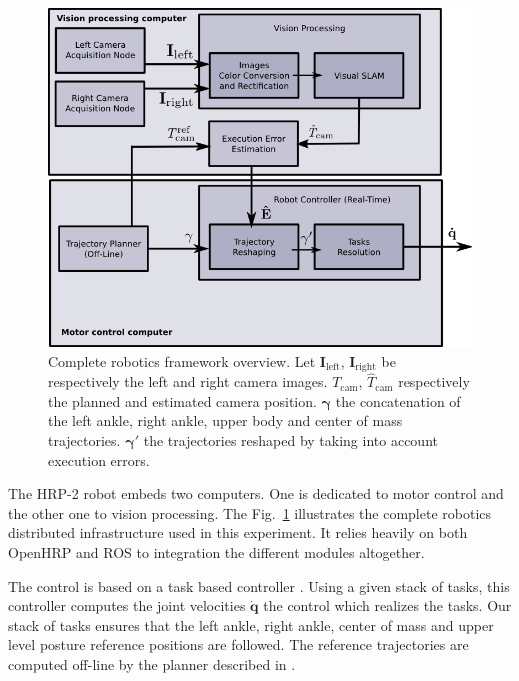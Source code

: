 \begin{figure}[ht!]
  \begin{center}
    \includegraphics[width=\linewidth]{images/rss_framework.png}
  \end{center}
  \caption{Complete robotics framework overview. Let
    $\mathbf{I}_{\text{left}}$, $\mathbf{I}_{\text{right}}$ be
    respectively the left and right camera
    images. $\mathit{T}_{\text{cam}}$, $\mathit{\hat{T}}_{\text{cam}}$
    respectively the planned and estimated camera
    position. $\mathbf{\gamma}$ the concatenation of the left ankle,
    right ankle, upper body and center of mass
    trajectories. $\mathbf{\gamma'}$ the trajectories reshaped by
    taking into account execution
    errors.\label{fig:framework_overview}}
\end{figure}


The HRP-2 robot embeds two computers. One is dedicated to motor
control and the other one to vision processing. The
Fig.~\ref{fig:framework_overview} illustrates the complete robotics
distributed infrastructure used in this experiment. It relies heavily
on both OpenHRP and ROS to integration the different modules
altogether.


The control is based on a task based controller
\cite{Mansard09icar}. Using a given stack of tasks, this controller
computes the joint velocities $\mathbf{\dot{q}}$ the control which
realizes the tasks. Our stack of tasks ensures that the left ankle,
right ankle, center of mass and upper level posture reference
positions are followed. The reference trajectories are computed
off-line by the planner described in \cite{Dalibard11humanoids}.

